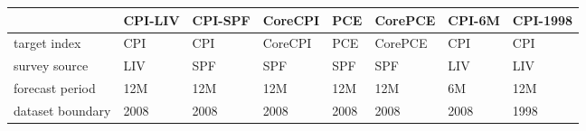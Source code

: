 \begin{tabular}{llllllll}
\toprule
{} & CPI-LIV & CPI-SPF &   CoreCPI &   PCE &   CorePCE & CPI-6M & CPI-1998 \\
\midrule
target index   &     CPI &     CPI &  CoreCPI &   PCE &  CorePCE &    CPI &      CPI \\
survey source   &     LIV &     SPF &       SPF &   SPF &       SPF &    LIV &      LIV \\
forecast period &     12M &     12M &       12M &   12M &       12M &     6M &      12M \\
dataset boundary &    2008 &    2008 &      2008 &  2008 &      2008 &   2008 &     1998 \\
\bottomrule
\end{tabular}

